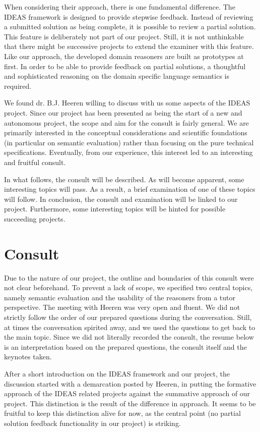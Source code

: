 When considering their approach, there is one fundamental difference. The IDEAS
framework is designed to provide stepwise feedback. Instead of reviewing a
submitted solution as being complete, it is possible to review a partial 
solution. This feature is deliberately not part of our project. Still, it is 
not unthinkable that there might be successive projects to extend the 
\gls{examiner} with this feature. Like our approach, the developed domain 
reasoners are built as prototypes at first. In order to be able to provide 
feedback on partial solutions, a thoughtful and sophisticated reasoning on the 
domain specific language semantics is required.


We found dr. B.J. Heeren willing to discuss with us some aspects of the IDEAS 
project. Since our project has been presented as being the start of a new and 
autonomous project, the scope and aim for the consult is fairly general. 
We are primarily interested in the conceptual considerations and scientific 
foundations (in particular on semantic evaluation) rather than focusing on the 
pure technical specifications. Eventually, from our
experience, this interest led to an interesting and fruitful consult. 


In what follows, the consult will be described. As will become apparent, some 
interesting topics will pass. As a result, a brief examination of one of these 
topics will follow. In conclusion, the consult and examination will be linked 
to our project. Furthermore, some interesting topics will be hinted for 
possible succeeding projects.


\section{Consult}
Due to the nature of our project, the outline and boundaries of this consult 
were not clear beforehand. To prevent a lack of scope, we specified two 
central topics, namely semantic evaluation and the usability of the reasoners 
from a tutor perspective. The meeting with Heeren was very open and fluent. We 
did not strictly follow the order of our prepared questions during the 
conversation. Still, at times the 
conversation spirited away, and we used the questions to get back to the main 
topic. Since we did not literally recorded the consult, the resume below is an 
interpretation based on the prepared questions, the consult itself and the 
keynotes taken.

After a short introduction on the IDEAS framework and our project, the 
discussion started with a demarcation posted by Heeren, in putting the 
formative approach of the IDEAS related projects against the summative 
approach of our project. This distinction is the result of the difference in 
approach.
It seems to be fruitful to keep this distinction alive for now, as the 
central point (no partial solution feedback functionality in our project) is 
striking. 


